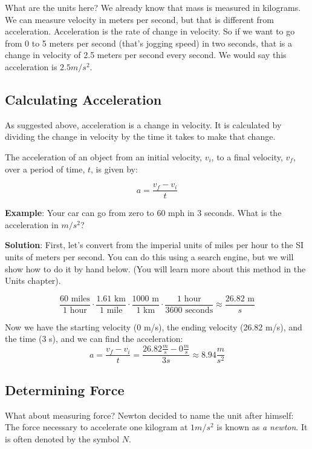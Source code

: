 What are the units here? We already know that mass is measured in
kilograms. We can measure velocity in meters per second, but that is
different from acceleration. Acceleration is the rate of change in
velocity. So if we want to go from 0 to 5 meters per second (that's
jogging speed) in two seconds, that is a change in velocity of 2.5
meters per second every second. We would say this acceleration is $2.5
m/s^2$.

\subsection{Calculating Acceleration}
As suggested above, acceleration is a change in velocity. It is calculated by
dividing the change in velocity by the time it takes to make that change.

\begin{mdframed}[style = important, frametitle = {Calculating Acceleration}]
The acceleration of an object from an initial velocity, $v_i$, to a final
velocity, $v_f$, over a period of time, $t$, is given by:

$$a = \frac{v_f - v_i}{t}$$
\end{mdframed}

\textbf{Example}: Your car can go from zero to 60 mph in 3 seconds. What is the
acceleration in $m / s^2$?

\textbf{Solution}: First, let's convert from the imperial units of miles per
hour to the SI units of meters per second. You can do this using a search engine, 
but we will show how to do it by hand below. (You will learn more about this 
method in the Units chapter).

$$\frac{60 \text{ miles}}{1 \text{ hour}} \cdot \frac{1.61 \text{ km}}{1 
\text{ mile}} \cdot \frac{1000\text{ m}}{1\text{ km}} \cdot \frac{1\text{ hour}}{
3600\text{ seconds}} \approx \frac{26.82\text{ m}}{s}$$

Now we have the starting velocity (0 m/s), the ending velocity (26.82 m/s), and 
the time (3 s), and we can find the acceleration:
$$a = \frac{v_f - v_i}{t} = \frac{26.82\frac{m}{s} - 0\frac{m}{s}}{3s} \approx 
8.94 \frac{m}{s^2}$$

\subsection{Determining Force}
What about measuring force? Newton decided to name the unit after himself: The
force necessary to accelerate one kilogram at $1 m/s^2$ is known as \textit{a
newton}. It is often denoted by the symbol $N$.

